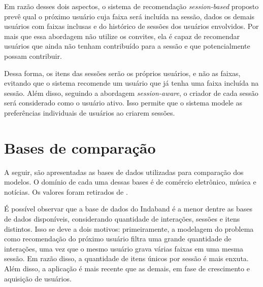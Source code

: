 Em razão desses dois aspectos, o sistema de recomendação \textit{session-based}
proposto prevê qual o próximo usuário cuja faixa será incluída na sessão, dados
os demais usuários com faixas inclusas e do histórico de sessões dos usuários
envolvidos. Por mais que essa abordagem não utilize os convites, ela é capaz de
recomendar usuários que ainda não tenham contribuído para a sessão e que
potencialmente possam contribuir.

Dessa forma, os itens das sessões serão os próprios usuários, e não as faixas,
evitando que o sistema recomende um usuário que já tenha uma faixa incluída na
sessão. Além disso, seguindo a abordagem \textit{session-aware}, o criador de
cada sessão será considerado como o usuário ativo. Isso permite que o sistema
modele as preferências individuais de usuários ao criarem sessões.

 \section{Bases de comparação}
 A seguir, são apresentadas as bases de dados utilizadas para comparação dos
  modelos. O domínio de cada uma dessas bases é de comércio eletrônico,
  música e notícias. Os valores foram retirados de \citet{ludewig_2018}.

  É possível observar que a base de dados do Indaband é a menor dentre as bases
  de dados disponíveis, considerando quantidade de interações, sessões e itens
  distintos. Isso se deve a dois motivos: primeiramente, a modelagem do problema
  como recomendação do próximo usuário filtra uma grande quantidade de
  interações, uma vez que o mesmo usuário grava várias faixas em uma mesma
  sessão. Em razão disso, a quantidade de itens únicos por sessão é mais enxuta.
  Além disso, a aplicação é mais recente que as demais, em fase de crescimento e
  aquisição de usuários.

